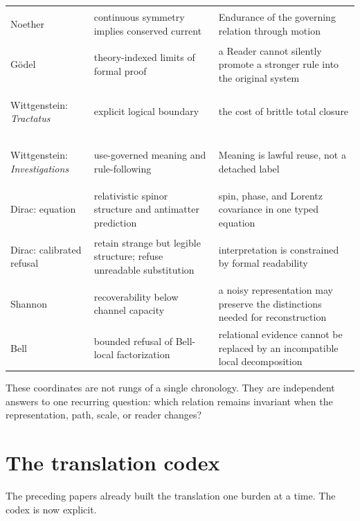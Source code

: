 \documentclass[11pt]{article}
\begin{document}
\begin{longtable}{@{}>{\bfseries\raggedright\arraybackslash}p{}>{\raggedright\arraybackslash}p{}>{\raggedright\arraybackslash}p{}@{}}
Noether & continuous symmetry implies conserved current & Endurance of the governing relation through motion\\
G\"odel & theory-indexed limits of formal proof & a Reader cannot silently promote a stronger rule into the original system\\
Wittgenstein: \emph{Tractatus} & explicit logical boundary & the cost of brittle total closure\\
Wittgenstein: \emph{Investigations} & use-governed meaning and rule-following & Meaning is lawful reuse, not a detached label\\
Dirac: equation & relativistic spinor structure and antimatter prediction & spin, phase, and Lorentz covariance in one typed equation\\
Dirac: calibrated refusal & retain strange but legible structure; refuse unreadable substitution & interpretation is constrained by formal readability\\
Shannon & recoverability below channel capacity & a noisy representation may preserve the distinctions needed for reconstruction\\
Bell & bounded refusal of Bell-local factorization & relational evidence cannot be replaced by an incompatible local decomposition\\
\bottomrule
\end{longtable}
\normalsize

These coordinates are not rungs of a single chronology. They are independent answers to one recurring question: which relation remains invariant when the representation, path, scale, or reader changes?

\section{The translation codex}

The preceding papers already built the translation one burden at a time. The codex is now explicit.
\end{document}
